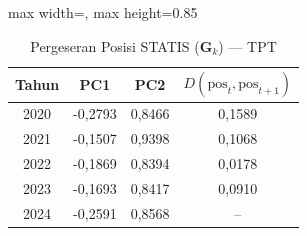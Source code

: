 \begin{table}[H]
\centering
\caption{Pergeseran Posisi STATIS ($\mathbf{G}_k$) --- TPT} \label{tab:app2jarak_statis_loading_tpt}
\begin{adjustbox}{max width=\textwidth, max height=0.85\textheight}
\begin{tabular}{|c|c|c|c|}
\hline
\textbf{Tahun} & \textbf{PC1} & \textbf{PC2} & \textbf{$D(\text{pos}_t, \text{pos}_{t+1})$} \\
\hline
2020 & -0,2793 & 0,8466 & 0,1589 \\
2021 & -0,1507 & 0,9398 & 0,1068 \\
2022 & -0,1869 & 0,8394 & 0,0178 \\
2023 & -0,1693 & 0,8417 & 0,0910 \\
2024 & -0,2591 & 0,8568 & -- \\
\hline
\end{tabular}
\end{adjustbox}
\end{table}